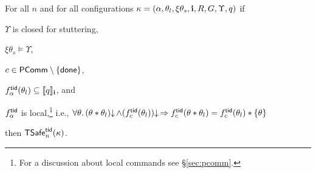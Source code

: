\begin{lemma}[Local]\label{lem:local}
For all $n$ and for all 
configurations $\kappa=(\alpha,\theta_l,\xi\theta_s,{\bf i},R,G,\Upsilon, q)$
if 
\begin{compactenum}[(i)]
\item \label{lem:local:stutter} 
$\Upsilon$ is closed for stuttering, 
\item \label{lem:local:inv} 
$\xi\theta_s\vDash\Upsilon$, 
\item 
$c\in{\sf PComm} \setminus\{{\sf done}\}$, 
\item \label{lem:local:post}
$f^{{\sf tid}}_\alpha(\theta_l) \subseteq \llbracket q \rrbracket_{{\bf i}}$, and  
\item 
$f^{{\sf tid}}_\alpha$ is local,\footnote{For a discussion about  local commands see   
\S\ref{sec:pcomm}.} 
i.e., $\forall \theta.\, (\theta*\theta_l)\mathpunct{\downarrow} \land (f^{{\sf tid}}_c(\theta_l))\mathpunct{\downarrow} \Rightarrow f^{{\sf tid}}_c(\theta *\theta_l) = f^{{\sf tid}}_c(\theta_l)*\{\theta\}$
\end{compactenum}
then ${\sf TSafe}^{{\sf tid}}_n(\kappa)$.
\end{lemma}

